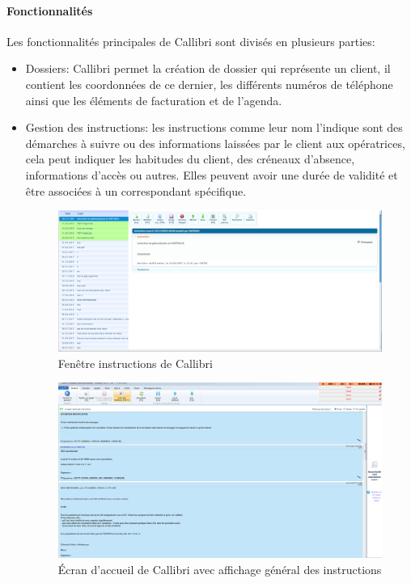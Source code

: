 \paragraph{Fonctionnalités \newline}
Les fonctionnalités principales de \gls{Callibri} sont divisés en plusieurs parties: \newline
\begin{itemize}
    \item Dossiers: \gls{Callibri} permet la création de dossier qui représente un client,
    il contient les coordonnées de ce dernier, les différents numéros de téléphone ainsi que les éléments
    de facturation et de l'agenda. \newline

    \item Gestion des instructions: les instructions comme leur nom l'indique sont des démarches 
    à suivre ou des informations laissées par le client aux opératrices, cela peut indiquer les habitudes du client, 
    des créneaux d'absence, informations d'accès ou autres. Elles peuvent avoir une durée de validité 
    et être associées à un correspondant spécifique. \newline 

    \begin{figure}[!h]
        \centering
	    \includegraphics[width=1.1\linewidth]{Images/instructions}
	    \caption{Fenêtre instructions de Callibri \newline}
	    \label{fig:callibriInstructions}
    \end{figure}

    \begin{figure}[!h]
        \centering
	    \includegraphics[width=0.9\linewidth]{Images/callibri_accueil_2}
	    \caption{Écran d'accueil de Callibri avec affichage général des instructions \newline}
	    \label{fig:callibriInstructions2}
    \end{figure}
    \newpage



\end{itemize}
